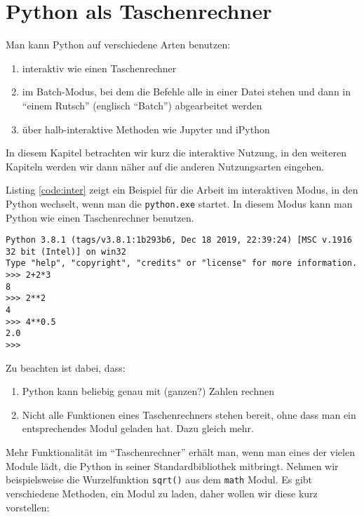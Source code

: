 \documentclass[12pt,ngerman]{scrreprt}
\begin{document}
\chapter{Python als Taschenrechner}

Man kann Python auf verschiedene Arten benutzen:

\begin{enumerate}
\item interaktiv wie einen Taschenrechner
\item im Batch-Modus, bei dem die Befehle alle in einer Datei stehen und dann in \enquote{einem Rutsch} (englisch \enquote{Batch}) abgearbeitet werden
\item über halb-interaktive Methoden wie Jupyter und iPython
\end{enumerate}

In diesem Kapitel betrachten wir kurz die interaktive Nutzung, in den weiteren Kapiteln werden wir dann näher auf die anderen Nutzungsarten eingehen. 

Listing \ref{code:inter} zeigt ein Beispiel für die Arbeit im interaktiven Modus, in den Python wechselt, wenn man die \texttt{python.exe} startet. In diesem Modus kann man Python wie einen Taschenrechner benutzen.

\begin{lstlisting}[caption={Im interaktiven Modus},label={code:inter}]
Python 3.8.1 (tags/v3.8.1:1b293b6, Dec 18 2019, 22:39:24) [MSC v.1916 32 bit (Intel)] on win32
Type "help", "copyright", "credits" or "license" for more information.
>>> 2+2*3
8
>>> 2**2
4
>>> 4**0.5
2.0
>>>
\end{lstlisting}

Zu beachten ist dabei, dass:

\begin{enumerate}
\item Python kann beliebig genau mit (ganzen?) Zahlen rechnen
\item Nicht alle Funktionen eines Taschenrechners stehen bereit, ohne dass man ein entsprechendes Modul geladen hat. Dazu gleich mehr.
\end{enumerate}

Mehr Funktionalität im \enquote{Taschenrechner} erhält man, wenn man eines der vielen Module lädt, die Python in seiner Standardbibliothek mitbringt. Nehmen wir beispielsweise die Wurzelfunktion \texttt{sqrt()} aus dem \texttt{math} Modul. Es gibt verschiedene Methoden, ein Modul zu laden, daher wollen wir diese kurz vorstellen:
\end{document}
